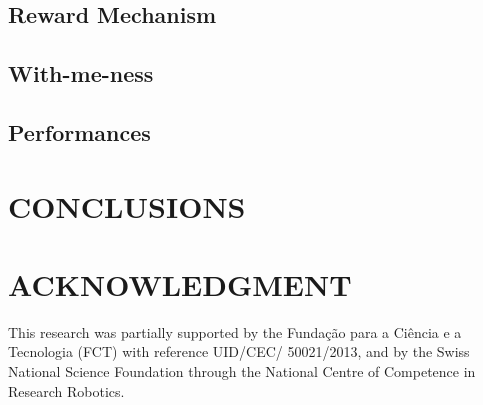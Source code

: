 \documentclass[letterpaper, 10 pt, conference]{ieeeconf}  %
\begin{document}
\subsection{Reward Mechanism}
 


\subsection{With-me-ness}


\subsection{Performances}


\section{CONCLUSIONS}



\addtolength{\textheight}{-12cm}   %








\section*{ACKNOWLEDGMENT}
This research was partially supported by the Funda\c{c}\~{a}o para a Ci\^{e}ncia
e a Tecnologia (FCT) with reference UID/CEC/ 50021/2013, and by the Swiss
National Science Foundation through the National Centre of Competence in
Research Robotics.









\end{document}
